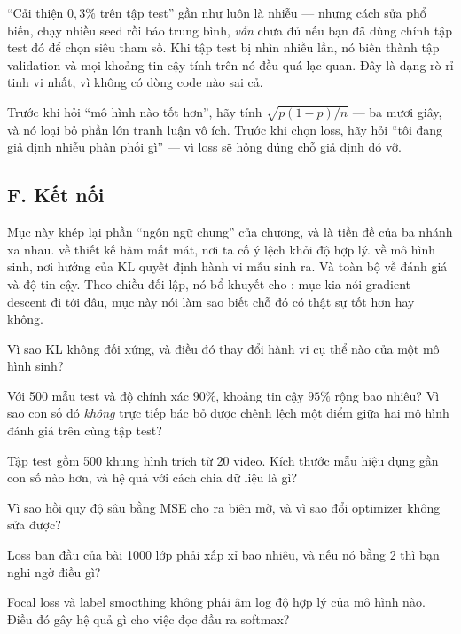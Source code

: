 \documentclass[../../../deep_learning.tex]{subfiles}
\begin{document}
\begin{cambay}
``Cải thiện \(0{,}3\%\) trên tập test'' gần như luôn là nhiễu --- nhưng cách sửa phổ biến, chạy nhiều seed rồi báo trung bình, \emph{vẫn} chưa đủ nếu bạn đã dùng chính tập test đó để chọn siêu tham số. Khi tập test bị nhìn nhiều lần, nó biến thành tập validation và mọi khoảng tin cậy tính trên nó đều quá lạc quan. Đây là dạng rò rỉ tinh vi nhất, vì không có dòng code nào sai cả.
\end{cambay}

\begin{cannho}
Trước khi hỏi ``mô hình nào tốt hơn'', hãy tính \(\sqrt{p(1-p)/n}\) --- ba mươi giây, và nó loại bỏ phần lớn tranh luận vô ích. Trước khi chọn loss, hãy hỏi ``tôi đang giả định nhiễu phân phối gì'' --- vì loss sẽ hỏng đúng chỗ giả định đó vỡ. 
\end{cannho}

\subsection{F. Kết nối}
Mục này khép lại phần ``ngôn ngữ chung'' của chương, và là tiền đề của ba nhánh xa nhau.  về thiết kế hàm mất mát, nơi ta cố ý lệch khỏi độ hợp lý.  về mô hình sinh, nơi hướng của KL quyết định hành vi mẫu sinh ra. Và toàn bộ  về đánh giá và độ tin cậy. Theo chiều đối lập, nó bổ khuyết cho : mục kia nói gradient descent đi tới đâu, mục này nói làm sao biết chỗ đó có thật sự tốt hơn hay không.

\begin{tukiem}
\item Vì sao KL không đối xứng, và điều đó thay đổi hành vi cụ thể nào của một mô hình sinh?
\item Với 500 mẫu test và độ chính xác \(90\%\), khoảng tin cậy \(95\%\) rộng bao nhiêu? Vì sao con số đó \emph{không} trực tiếp bác bỏ được chênh lệch một điểm giữa hai mô hình đánh giá trên cùng tập test?
\item Tập test gồm 500 khung hình trích từ 20 video. Kích thước mẫu hiệu dụng gần con số nào hơn, và hệ quả với cách chia dữ liệu là gì?
\item Vì sao hồi quy độ sâu bằng MSE cho ra biên mờ, và vì sao đổi optimizer không sửa được?
\item Loss ban đầu của bài 1000 lớp phải xấp xỉ bao nhiêu, và nếu nó bằng 2 thì bạn nghi ngờ điều gì?
\item Focal loss và label smoothing không phải âm log độ hợp lý của mô hình nào. Điều đó gây hệ quả gì cho việc đọc đầu ra softmax?
\end{tukiem}
\ifSubfilesClassLoaded{\printbibliography[title={Nguồn}]}{}
\end{document}
